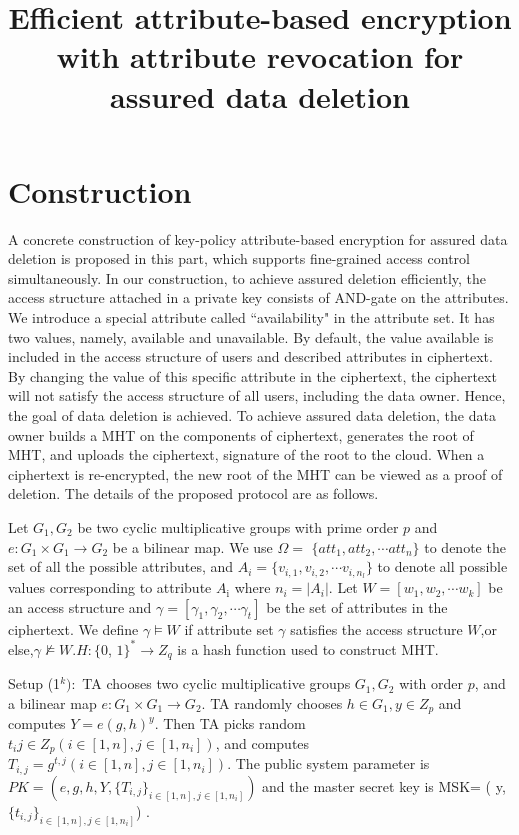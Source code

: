 \documentclass[runningheads]{llncs}
\begin{document}
\title{Efficient attribute-based encryption with attribute revocation
for assured data deletion}
\section{Construction}
A concrete construction of key-policy attribute-based encryption for assured data deletion is proposed in this part, which supports fine-grained access control simultaneously. In our construction, to achieve assured deletion efficiently, the access structure attached in a private key consists of AND-gate on the attributes. We introduce a special attribute called “availability" in the attribute set. It has two values, namely, available and unavailable. By default, the value available is included in the access structure of users and described attributes in ciphertext. By changing the value of this specific attribute in the ciphertext, the ciphertext will not satisfy the access structure of all users, including the data owner. Hence, the goal of data deletion is achieved. To achieve assured data deletion, the data owner builds a MHT on the components of ciphertext, generates the root of MHT, and uploads the ciphertext, signature of the root to the cloud. When a ciphertext is re-encrypted, the new root of the MHT can be viewed as a proof of deletion. The details of the proposed protocol are as follows.

Let $G_1,G_2$ be two cyclic multiplicative groups with prime order $p$ and $e:G_1\times G_1\to G_2$ be a bilinear map. We use $\Omega=$ $\{att_1,att_2,\cdots att_n\}$ to denote the set of all the possible attributes, and $A_i=\{v_{i,1},v_{i,2},\cdots v_{i,n_l}\}$ to denote all possible values corresponding to attribute $A_{\mathrm{i}}$ where $n_i=|A_i|.$ Let $W=[w_1,w_2,\cdots w_k]$ be an access structure and $\gamma=[\gamma_1,\gamma_2,\cdots\gamma_t]$ be the set of attributes in the ciphertext. We define $\gamma\vDash W$ if attribute set $\gamma$ satisfies the access structure $W$,or else,$\gamma\not\models W.H:\{0$, $1\}^*\to Z_q$ is a hash function used to construct MHT.

Setup (1$^k):$ TA chooses two cyclic multiplicative groups $G_1,G_2$ with order $p$, and a bilinear map $e:G_1\times G_1\to G_2.$ TA randomly chooses $h\in G_1,y\in Z_p$ and computes $Y=e(g,h)^y.$ Then TA picks random $t_ij\in Z_p(i\in[1,n],j\in[1,n_i])$, and computes $T_{i,j}=g^{t,j}(i\in[1,n],j\in[1,n_{i}]).$ The public system parameter is $PK=(e,g,h,Y,\{T_{i,j}\}_{i\in[1,n],j\in[1,n_{i}]})$ and the master secret key is MSK= ( y, $\{ t_{i, j}\} _{i\in [ 1, n] , j\in [ 1, n_{i}] }$) .
\end{document}

